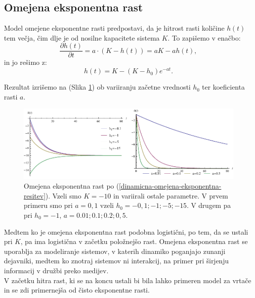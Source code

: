 \documentclass[a4paper, twoside, 12pt]{book}
\begin{document}
\subsection{Omejena eksponentna rast}

Model omejene eksponentne rasti predpostavi, da je hitrost rasti količine $h(t)$ tem večja, čim dlje je od nosilne kapacitete sistema $K$. To zapišemo v enačbo:
    \begin{equation}
      \frac{\partial h(t)}{\partial t} = a \cdot ( K - h(t) ) = a K - a h(t),
      \label{dinamicna-omejena-eksponentna}
    \end{equation}
in jo rešimo z:
   \begin{equation}
      h(t) = K - (K - h_0) e^{-a t}.
      \label{dinamicna-omejena-eksponentna-resitev}
    \end{equation}

Rezultat izrišemo na (Slika \ref{fig:omejena-eksponentna-rast}) ob variiranju začetne vrednosti $h_0$ ter koeficienta rasti $a$.

    \begin{figure}[h]
      \begin{center}
        \includegraphics[width=14cm]{slike/omejena-eksponentna-rast}
      \end{center}
      \caption{Omejena eksponentna rast po (\ref{dinamicna-omejena-eksponentna-resitev}). Vzeli smo $K=-10$ in variirali ostale parametre. V prvem primeru smo pri $a=0,1$ vzeli $h_0=-0,1;-1;-5;-15$. V drugem pa pri $h_0=-1$, $a=0.01;0.1;0.2;0,5$.}
      \label{fig:omejena-eksponentna-rast}
    \end{figure}

    Medtem ko je omejena eksponentna rast podobna logistični, po tem, da se ustali pri $K$, pa ima logistična v začetku položnejšo rast. Omejena eksponentna rast se uporablja za modeliranje sistemov, v katerih dinamiko poganjajo zunanji dejavniki, medtem ko znotraj sistemov ni interakcij, na primer pri širjenju informacij v družbi preko medijev.\\
V začetku hitra rast, ki se na koncu ustali bi bila lahko primeren model za vrtače in se zdi primernejša od čisto eksponentne rasti.
\end{document}
